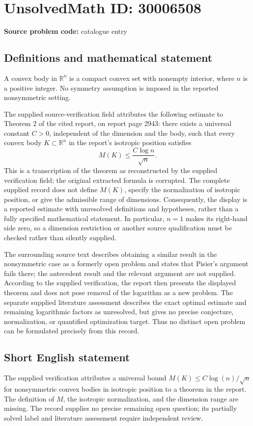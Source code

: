 \documentclass[11pt]{article}
\newcommand{\R}{\mathbb{R}}
\begin{document}
\section*{UnsolvedMath ID: 30006508}
\textbf{Source problem code:} catalogue entry
\subsection{Definitions and mathematical statement}
A convex body in \(\R^n\) is a compact convex set with nonempty interior, where \(n\) is a positive integer. No symmetry assumption is imposed in the reported nonsymmetric setting.

The supplied source-verification field attributes the following estimate to Theorem 2 of the cited report, on report page 2943: there exists a universal constant \(C>0\), independent of the dimension and the body, such that every convex body \(K\subset\R^n\) in the report's isotropic position satisfies
\[
M(K)\leq \frac{C\log n}{\sqrt n}.
\]
This is a transcription of the theorem as reconstructed by the supplied verification field; the original extracted formula is corrupted. The complete supplied record does not define \(M(K)\), specify the normalization of isotropic position, or give the admissible range of dimensions. Consequently, the display is a reported estimate with unresolved definitions and hypotheses, rather than a fully specified mathematical statement. In particular, \(n=1\) makes its right-hand side zero, so a dimension restriction or another source qualification must be checked rather than silently supplied.

The surrounding source text describes obtaining a similar result in the nonsymmetric case as a formerly open problem and states that Pisier's argument fails there; the antecedent result and the relevant argument are not supplied. According to the supplied verification, the report then presents the displayed theorem and does not pose removal of the logarithm as a new problem. The separate supplied literature assessment describes the exact optimal estimate and remaining logarithmic factors as unresolved, but gives no precise conjecture, normalization, or quantified optimization target. Thus no distinct open problem can be formulated precisely from this record.
\subsection{Short English statement}
The supplied verification attributes a universal bound \(M(K)\leq C\log(n)/\sqrt n\) for nonsymmetric convex bodies in isotropic position to a theorem in the report. The definition of \(M\), the isotropic normalization, and the dimension range are missing. The record supplies no precise remaining open question; its partially solved label and literature assessment require independent review.
\end{document}
